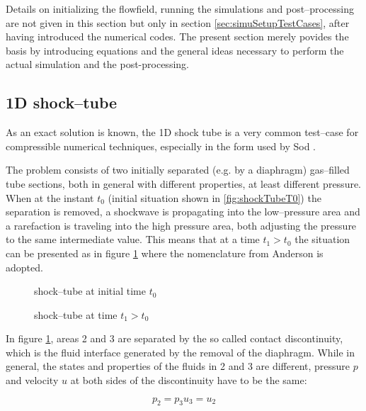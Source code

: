 \documentclass{report}
\begin{document}
Details on initializing the flowfield, running the simulations and post--processing are not given in this section but only in section \ref{sec:simuSetupTestCases}, after having introduced the numerical codes. The present section merely povides the basis by introducing equations and the general ideas necessary to perform the actual simulation and the post-processing.

\subsection{1D shock--tube}
As an exact solution is known, the 1D shock tube is a very common test--case for compressible numerical techniques, especially in the form used by Sod \cite{Sod1978}.

 The problem consists of two initially separated (e.g. by a diaphragm) gas--filled tube sections, both in general with different properties, at least different pressure. When at the instant $t_0$ (initial situation shown in \ref{fig:shockTubeT0}) the separation is removed, a shockwave is propagating into the low--pressure area and a rarefaction is traveling into the high pressure area, both adjusting the pressure to the same intermediate value. This means that at a time $t_1>t_0$ the situation can be presented as in figure \ref{fig:shockTubeT1} where the nomenclature from Anderson \cite{Anderson2002} is adopted.

\begin{figure}[h]
    \centering
      
      \caption{shock--tube at initial time $t_0$}
      \label{fig:shockTubeT0}

      
      \caption{shock--tube at time $t_1>t_0$}
      \label{fig:shockTubeT1}
\end{figure}

In figure \ref{fig:shockTubeT1}, areas 2 and 3 are separated by the so called contact discontinuity, which is the fluid interface generated by the removal of the diaphragm. While in general, the states and properties of the fluids in 2 and 3 are different, pressure $p$ and velocity $u$ at both sides of the discontinuity have to be the same:

\begin{equation}
\label{eq:condCD}
p_2=p_3
u_3=u_2
\end{equation}
\end{document}
